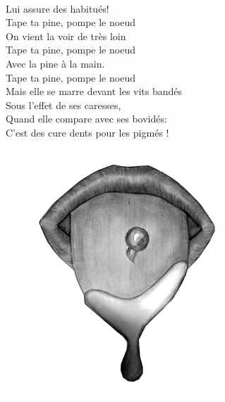 \\Lui assure des habitués! 
\\ Tape ta pine, pompe le noeud
\\On vient la voir de très loin 
\\ Tape ta pine, pompe le noeud
\\Avec la pine à la main. 
\\ Tape ta pine, pompe le noeud
\\Mais elle se marre devant les vits bandés
\\Sous l'effet de ses caresses,
\\Quand elle compare avec ses bovidés:
\\C'est des cure dents pour les pigmés !
\begin{figure}[h!]
\centering
   \includegraphics[width=0.62\textwidth]{images/taureau.png}
 \end{figure}
 
 \breakpage